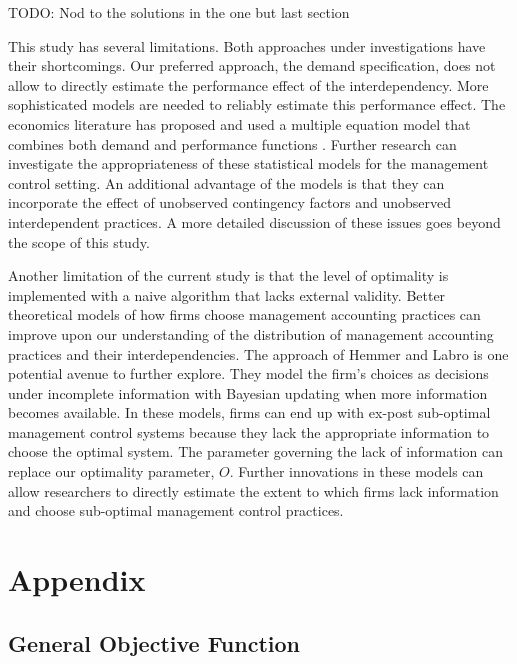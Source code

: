 \documentclass[12pt]{article}
\begin{document}
TODO: Nod to the solutions in the one but last section

This study has several limitations. Both approaches under investigations have their shortcomings. Our preferred approach, the demand specification, does not allow to directly estimate the performance effect of the interdependency. More sophisticated models are needed to reliably estimate this performance effect. The economics literature has proposed and used a multiple equation model that combines both demand and performance functions \citep{Athey1998, Gentzkow2007, Kretschmer2012, Miravete2006}. Further research can investigate the appropriateness of these statistical models for the management control setting. An additional advantage of the models is that they can incorporate the effect of unobserved contingency factors and unobserved interdependent practices. A more detailed discussion of these issues goes beyond the scope of this study.

Another limitation of the current study is that the level of optimality is implemented with a naive algorithm that lacks external validity. Better theoretical models of how firms choose management accounting practices can improve upon our understanding of the distribution of management accounting practices and their interdependencies. The approach of Hemmer and Labro \citeyearpar{Hemmer2015} is one potential avenue to further explore. They model the firm's choices as decisions under incomplete information with Bayesian updating when more information becomes available. In these models, firms can end up with ex-post sub-optimal management control systems because they lack the appropriate information to choose the optimal system. The parameter governing the lack of information can replace our optimality parameter, \(O\). Further innovations in these models can allow researchers to directly estimate the extent to which firms lack information and choose sub-optimal management control practices.

\pagebreak
 
\appendix
\renewcommand{\theequation}{A.\arabic{equation}}
\setcounter{equation}{0}

\section{Appendix}\label{appendix}
\subsection{General Objective Function}\label{appendix-general}
\end{document}
